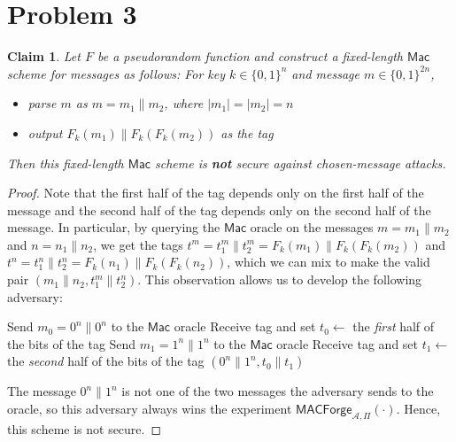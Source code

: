 \documentclass[12pt]{article}
\numberwithin{equation}{section}
\theoremstyle{plain}
\newtheorem{claim}{Claim}
\newcommand{\set}[1]{\{ #1 \}}
\newcommand{\algo}[1]{\mathsf{#1}}
\newcommand{\adv}{\mathcal{A}}
\newcommand{\mac}{\algo{Mac}}
\newcommand{\macexpir}[2]{\algo{MACForge}_{{#1},{#2}}}
\begin{document}
\newpage
\section*{Problem 3}

\begin{claim}
Let $F$ be a pseudorandom function
and construct a fixed-length $\mac$ scheme for messages as follows:
For key $k \in \set{ 0, 1 }^n$ and message $m \in \set{ 0, 1 }^{2n}$,
\begin{itemize}
    \item parse $m$ as $m = m_1 \| m_2$, where $|m_1| = |m_2| = n$
    \item output $F_k(m_1) \| F_k(F_k(m_2))$ as the tag
\end{itemize}
Then this fixed-length $\mac$ scheme is \textbf{not} secure against chosen-message attacks.
\end{claim}
\begin{proof}
Note that the first half of the tag depends only on the first half of
the message and the second half of the tag depends only on the second
half of the message.
In particular, by querying the $\mac$ oracle on the messages
$m = m_1 \| m_2$ and $n = n_1 \| n_2$,
we get the tags
$t^m = t^m_1 \| t^m_2 = F_k(m_1) \| F_k(F_k(m_2))$ and $t^n = t^n_1 \| t^n_2 = F_k(n_1) \| F_k(F_k(n_2))$,
which we can mix to make the valid pair
$(m_1 \| n_2, t^m_1 \| t^n_2)$.
This observation allows us to develop the following adversary:
\begin{algorithm}[H]
\begin{algorithmic}
    \State Send $m_0 = 0^n \| 0^n$ to the $\mac$ oracle
    \State Receive tag and set $t_0 \gets$ the \textit{first} half of the bits of the tag
    \State Send $m_1 = 1^n \| 1^n$ to the $\mac$ oracle
    \State Receive tag and set $t_1 \gets$ the \textit{second} half of the bits of the tag
    \State \Return $(0^n \| 1^n, t_0 \| t_1)$
\EndProcedure
\end{algorithmic}
\end{algorithm}
The message $0^n \| 1^n$ is not one of the two messages the adversary sends to the oracle,
so this adversary always wins the experiment $\macexpir{\adv}{\Pi}(\cdot)$.
Hence, this scheme is not secure.
\end{proof}
\end{document}
